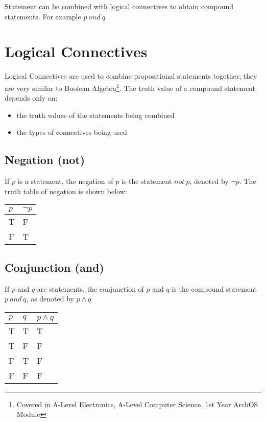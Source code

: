 Statement can be combined with logical connectives to obtain compound statements. For example $p\ and\ q$

\section{Logical Connectives}
Logical Connectives are used to combine propositional statements together; they are very similar to Boolean Algebra\footnote{Covered in A-Level Electronics, A-Level Computer Science, 1st Year ArchOS Module}. The truth value of a compound statement depends only on:
\begin{itemize}
    \item the truth values of the statements being combined
    \item the types of connectives being used
\end{itemize}

\subsection{Negation (not)}
If $p$ is a statement, the negation of $p$ is the statement $not\ p$, denoted by $\neg p$. The truth table of negation is shown below:
\begin{table}[H]
    \centering
    \begin{tabular}{C{0.1\textwidth} C{0.1\textwidth}}
        \textbf{$p$} & \textbf{$\neg p$}\\
        \hline
        \hline
        T & F \\
        \hline
        F & T \\
        \hline
    \end{tabular}
\end{table}

\subsection{Conjunction (and)}
If $p$ and $q$ are statements, the conjunction of $p$ and $q$ is the compound statement $p\ and\ q$, as denoted by $p \wedge q$
\begin{table}[H]
    \centering
    \begin{tabular}{C{0.1\textwidth} C{0.1\textwidth} C{0.1\textwidth}}
        $p$ & $q$ & $p \wedge q$\\
        \hline
        \hline
        T & T & T\\
        \hline
        T & F & F \\
        \hline
        F & T & F \\
        \hline
        F & F & F\\
        \hline
    \end{tabular}
\end{table}

